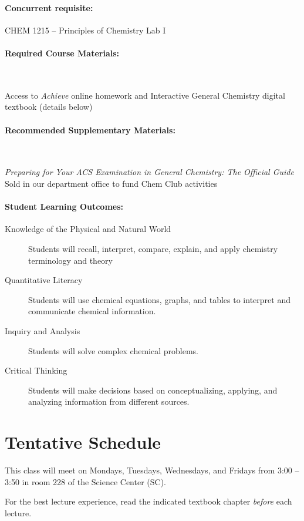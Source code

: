 \documentclass[12pt, letterpaper]{article}
\begin{document}
\paragraph{Concurrent requisite:}
CHEM 1215 -- Principles of Chemistry Lab I

\paragraph{Required Course Materials:} ~

Access to \emph{Achieve} online homework and Interactive General Chemistry digital textbook (details below)

\paragraph{Recommended Supplementary Materials:} ~

\emph{Preparing for Your ACS Examination in General Chemistry: The Official Guide} Sold in our department office to fund Chem Club activities

\paragraph{Student Learning Outcomes:}
\begin{description}
  \item[Knowledge of the Physical and Natural World] Students will recall, interpret, compare, explain, and apply chemistry terminology and theory
  \item[Quantitative Literacy] Students will use chemical equations, graphs, and tables to interpret and communicate chemical information.
  \item[Inquiry and Analysis] Students will solve complex chemical problems.
  \item[Critical Thinking] Students will make decisions based on conceptualizing, applying, and analyzing information from different sources.
\end{description}

\section*{Tentative Schedule}
This class will meet on Mondays, Tuesdays, Wednesdays, and Fridays from 3:00 -- 3:50 in room 228 of the Science Center (SC).

\noindent For the best lecture experience, read the indicated textbook chapter \emph{before} each lecture.
\end{document}
